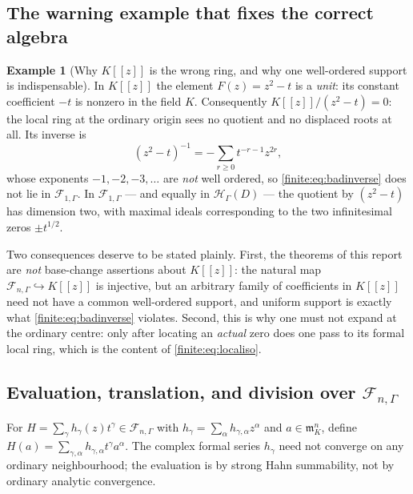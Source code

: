 \documentclass[11pt,letterpaper]{article}
\theoremstyle{definition}
\newtheorem{example}[theorem]{Example}
\theoremstyle{remark}
\newcommand{\HH}{\mathscr H}
\newcommand{\Af}{\mathscr F}
\newcommand{\mm}{\mathfrak m}
\numberwithin{equation}{section}
\begin{document}
\subsection{The warning example that fixes the correct algebra}
\label{finite:sec:warning}

\begin{example}[{Why $K[[z]]$ is the wrong ring, and why one well-ordered support is indispensable}]
\label{finite:ex:unit}
In $K[[z]]$ the element $F(z)=z^2-t$ is a \emph{unit}: its constant coefficient $-t$ is nonzero in the field $K$. Consequently $K[[z]]/(z^2-t)=0$: the local ring at the ordinary origin sees no quotient and no displaced roots at all. Its inverse is
\begin{equation}\label{finite:eq:badinverse}
 (z^2-t)^{-1}=-\sum_{r\geq0}t^{-r-1}z^{2r},
\end{equation}
whose exponents $-1,-2,-3,\ldots$ are \emph{not} well ordered, so \eqref{finite:eq:badinverse} does not lie in $\Af_{1,\Gamma}$. In $\Af_{1,\Gamma}$ --- and equally in $\HH_\Gamma(D)$ --- the quotient by $(z^2-t)$ has dimension two, with maximal ideals corresponding to the two infinitesimal zeros $\pm t^{1/2}$.
\end{example}

Two consequences deserve to be stated plainly. First, the theorems of this report are \emph{not} base-change assertions about $K[[z]]$: the natural map $\Af_{n,\Gamma}\hookrightarrow K[[z]]$ is injective, but an arbitrary family of coefficients in $K[[z]]$ need not have a common well-ordered support, and uniform support is exactly what \eqref{finite:eq:badinverse} violates. Second, this is why one must not expand at the ordinary centre: only after locating an \emph{actual} zero does one pass to its formal local ring, which is the content of \eqref{finite:eq:localiso}.

\subsection{Evaluation, translation, and division over \texorpdfstring{$\Af_{n,\Gamma}$}{the formal coefficient ring}}
\label{finite:sec:formaleval}

For $H=\sum_\gamma h_\gamma(z)t^\gamma\in\Af_{n,\Gamma}$ with $h_\gamma=\sum_\alpha h_{\gamma,\alpha}z^\alpha$ and $a\in\mm_K^n$, define $H(a)=\sum_{\gamma,\alpha}h_{\gamma,\alpha}t^\gamma a^\alpha$. The complex formal series $h_\gamma$ need not converge on any ordinary neighbourhood; the evaluation is by strong Hahn summability, not by ordinary analytic convergence.
\end{document}
